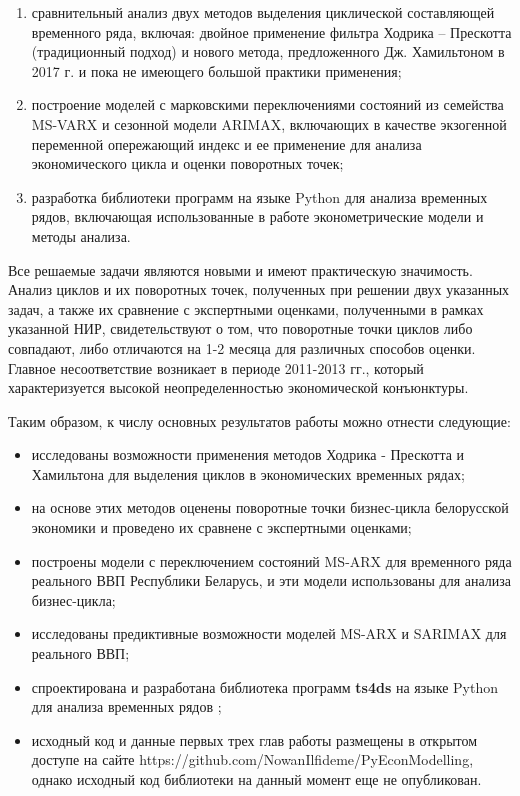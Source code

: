 \documentclass[a4paper,14pt]{extreport}
\begin{document}
{\begin{enumerate}
			\item   сравнительный анализ двух методов выделения циклической составляющей временного ряда, включая: двойное применение фильтра Ходрика – Прескотта (традиционный подход) и нового метода, предложенного Дж. Хамильтоном в 2017 г.  и пока не имеющего большой практики применения;
			\item   построение моделей с марковскими переключениями состояний из семейства MS-VARX и сезонной модели ARIMAX, включающих в качестве экзогенной переменной опережающий индекс и ее применение для анализа экономического цикла  и оценки поворотных точек;
			\item   разработка библиотеки программ на языке Python для анализа временных рядов, включающая использованные в работе эконометрические модели и методы анализа.
		\end{enumerate}
		
		Все решаемые задачи являются новыми и имеют практическую значимость. Анализ циклов и их поворотных точек, полученных при решении двух указанных задач, а также их сравнение с экспертными оценками, полученными в рамках указанной НИР, свидетельствуют о том, что поворотные точки циклов либо совпадают, либо отличаются на 1-2 месяца для различных способов оценки. Главное несоответствие  возникает в периоде 2011-2013 гг., который характеризуется высокой неопределенностью экономической конъюнктуры.
		
		Таким образом, к числу основных результатов работы можно отнести следующие:
		
		\begin{itemize}
			\item исследованы возможности применения методов Ходрика - Прескотта и Хамильтона для выделения циклов в экономических временных рядах;
			\item на основе этих методов оценены поворотные точки бизнес-цикла белорусской экономики и проведено их сравнене с экспертными оценками;
			\item построены модели с переключением состояний MS-ARX для временного ряда реального ВВП Республики Беларусь, и эти модели использованы для анализа бизнес-цикла;
			\item исследованы предиктивные возможности моделей MS-ARX и SARIMAX для реального ВВП;
			\item спроектирована и разработана библиотека программ \textbf{ts4ds} на языке Python для анализа временных рядов ;
			\item исходный код и данные  первых трех глав работы размещены в открытом доступе на сайте {https://github.com/NowanIlfideme/PyEconModelling}, однако исходный код библиотеки на данный момент еще не опубликован.
		\end{itemize}
		
}
\end{document}
